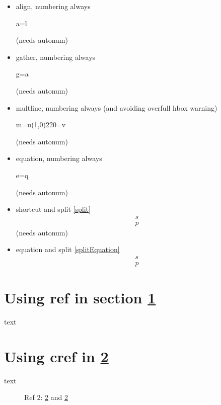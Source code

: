 \documentclass{article}
\begin{document}
\begin{itemize}
		\item align, numbering always \begin{align+} a=l \end{align+} (needs autonum)
		\item gather, numbering always \begin{gather+} g=a \end{gather+} (needs autonum)
		\item multline, numbering always (and avoiding overfull hbox warning) \begin{multline+} m=u\line(1,0){220}=v \end{multline+} (needs autonum)
		\item equation, numbering always \begin{equation+} e=q \end{equation+} (needs autonum)
		\item shortcut and split \ref{split} \[ \label{split}\begin{split} s \\ p \end{split} \] (needs autonum)
		\item equation and split \ref{splitEquation} \begin{equation} \label{splitEquation}\begin{split} s \\ p \end{split} \end{equation}
	\end{itemize}
	\section{Using ref in section \ref{i1}}\label{i1} text
	\section{Using cref in \cref{i2}}\label{i2} text
	\begin{figure}
		\caption{Ref 2: \cref{i2} and \ref{i2}}
	\end{figure}
\tableofcontents
\listoffigures
\end{document}

